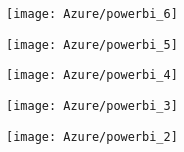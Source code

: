 \begin{center}
   \texttt{[image: Azure/powerbi\_6]}
   \label{fig:powerbi1}
\end{center}
 
 

\begin{center}
   \texttt{[image: Azure/powerbi\_5]}
   \label{fig:powerbi1}
\end{center}
 


\begin{center}
   \texttt{[image: Azure/powerbi\_4]}
   \label{fig:powerbi1}
\end{center}
 
 

\begin{center}
   \texttt{[image: Azure/powerbi\_3]}
   \label{fig:powerbi1}
\end{center}
 
 

\begin{center}
   \texttt{[image: Azure/powerbi\_2]}
   \label{fig:powerbi1}
\end{center}
 
 
